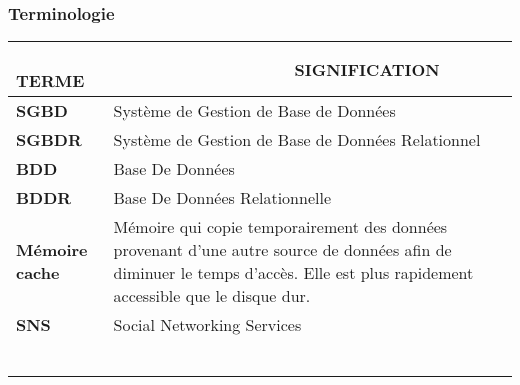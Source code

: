 \newpage

\def\termea{\bf \footnotesize SGBD}
\def\sensa{\footnotesize Système de Gestion de Base de Données}

\def\termeb{\bf \footnotesize SGBDR}
\def\sensb{\footnotesize Système de Gestion de Base de Données Relationnel}

\def\terme{\bf \footnotesize BDD}
\def\sens{\footnotesize Base De Données}

\def\termec{\bf \footnotesize BDDR}
\def\sensc{\footnotesize Base De Données Relationnelle}

\def\termed{\bf \footnotesize Mémoire cache}
\def\sensd{\footnotesize Mémoire qui copie temporairement des données provenant d'une autre source de données afin de diminuer le temps d'accès. Elle est plus rapidement accessible que le disque dur.}

\def\termee{\bf \footnotesize SNS}
\def\sense{\footnotesize Social Networking Services}

\def\termef{\bf \footnotesize }
\def\sensf{\footnotesize }

\def\termeg{\bf \footnotesize }
\def\sensg{\footnotesize }

\def\termeh{\bf \footnotesize }
\def\sensh{\footnotesize }

\def\termei{\bf \footnotesize }
\def\sensi{\footnotesize }

\def\termej{\bf \footnotesize }
\def\sensj{\footnotesize }

\def\termek{\bf \footnotesize }
\def\sensk{\footnotesize }



\begin{center}
\subsubsection*{Terminologie}
\begin{tabular}{p{5cm}p{12cm}}
\hline
{\bf ~~~~~ T{\scriptsize ERME}} & {\bf ~~~~~~~~~~~~~~~~~~~
S{\scriptsize IGNIFICATION}}\\
\hline
\termea &\sensa\\
\termeb &\sensb\\
\terme  &\sens\\
\termec  &\sensc\\
\termed  &\sensd\\
\termee  &\sense\\
\hline
\termef & \sensf\\
\termeg & \sensg\\
\termeh & \sensh\\
\termei & \sensi\\
\termej & \sensj\\
\termek & \sensk\\
\end{tabular}
 
\end{center}
